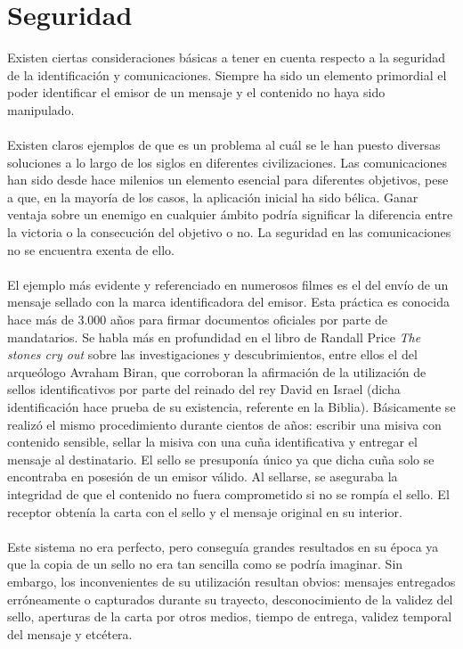 \documentclass[../PFC.tex]{subfiles}
\begin{document}
\section{Seguridad}
\label{Seguridad}

Existen ciertas consideraciones básicas a tener en cuenta respecto a la seguridad de la identificación y comunicaciones. Siempre ha sido un elemento primordial el poder identificar el emisor de un mensaje y el contenido no haya sido manipulado. 
\\\\
Existen claros ejemplos de que es un problema al cuál se le han puesto diversas soluciones a lo largo de los siglos en diferentes civilizaciones. Las comunicaciones han sido desde hace milenios un elemento esencial para diferentes objetivos, pese a que, en la mayoría de los casos, la aplicación inicial ha sido bélica. Ganar ventaja sobre un enemigo en cualquier ámbito podría significar la diferencia entre la victoria o la consecución del objetivo o no. La seguridad en las comunicaciones no se encuentra exenta de ello. 
\\\\
El ejemplo más evidente y referenciado en numerosos filmes es el del envío de un mensaje sellado con la marca identificadora del emisor. Esta práctica es conocida hace más de 3.000 años para firmar documentos oficiales por parte de mandatarios. Se habla más en profundidad en el libro de Randall Price \textit{The stones cry out}\cite{stonesCryOut} sobre las investigaciones y descubrimientos, entre ellos el del arqueólogo Avraham Biran, que corroboran la afirmación de la utilización de sellos identificativos por parte del reinado del rey David en Israel (dicha identificación hace prueba de su existencia, referente en la Biblia). Básicamente se realizó el mismo procedimiento durante cientos de años: escribir una misiva con contenido sensible, sellar la misiva con una cuña identificativa y entregar el mensaje al destinatario. El sello se presuponía único ya que dicha cuña solo se encontraba en posesión de un emisor válido. Al sellarse, se aseguraba la integridad de que el contenido no fuera comprometido si no se rompía el sello. El receptor obtenía la carta con el sello y el mensaje original en su interior.
\\\\
Este sistema no era perfecto, pero conseguía grandes resultados en su época ya que la copia de un sello no era tan sencilla como se podría imaginar. Sin embargo, los inconvenientes de su utilización resultan obvios: mensajes entregados erróneamente o capturados durante su trayecto, desconocimiento de la validez del sello, aperturas de la carta por otros medios, tiempo de entrega, validez temporal del mensaje y etcétera.
\end{document}
